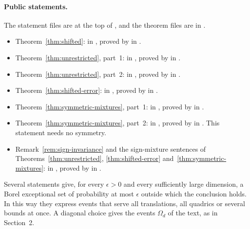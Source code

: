 \documentclass[11pt]{article}
\theoremstyle{remark}
\begin{document}
\paragraph{Public statements.}
The statement files are at the top of , and the
theorem files are in .
\begin{itemize}
\item Theorem~\ref{thm:shifted}:  in
  , proved by
   in
  .
\item Theorem~\ref{thm:unrestricted}, part~1:
   in
  , proved by
   in
  .
\item Theorem~\ref{thm:unrestricted}, part~2:
   in
  , proved by
   in
  .
\item Theorem~\ref{thm:shifted-error}:  in
  , proved by
   in .
\item Theorem~\ref{thm:symmetric-mixtures}, part~1:
   in
  , proved by
   in
  .
\item Theorem~\ref{thm:symmetric-mixtures}, part~2:
   in
  , proved by
   in
  .
  This statement needs no symmetry.
\item Remark~\ref{rem:sign-invariance} and the sign-mixture sentences of
  Theorems~\ref{thm:unrestricted}, \ref{thm:shifted-error}
  and~\ref{thm:symmetric-mixtures}:  in
  , proved by
   in .
\end{itemize}
Several statements give, for every $\epsilon>0$ and every sufficiently
large dimension, a Borel exceptional set of probability at most
$\epsilon$ outside which the conclusion holds. In this way they express
events that serve all translations, all quadrics or several bounds at
once. A diagonal choice gives the events $\Omega_d$ of the text, as in
Section~2.
\end{document}
